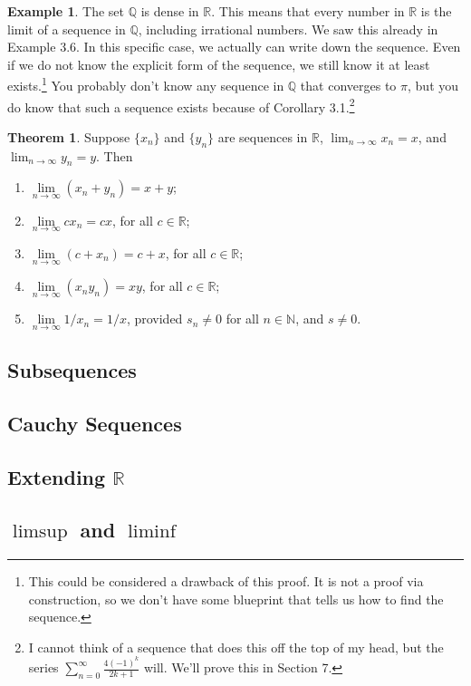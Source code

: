 \documentclass{article}
\newcommand{\N}{\mathbb{N}}
\newcommand{\R}{\mathbb{R}}
\newcommand{\Q}{\mathbb{Q}}
\theoremstyle{definition}
\newtheorem{theorem}{Theorem}[section]
\newtheorem{example}{Example}[section]
\begin{document}
\begin{example}
	The set $ \Q $ is dense in $ \R $. This means that every number in $ \R $ is the limit of a sequence in $ \Q $, including irrational numbers. We saw this already in Example 3.6. In this specific case, we actually can write down the sequence. Even if we do not know the explicit form of the sequence, we still know it at least exists.\footnote{This could be considered a drawback of this proof. It is not a proof via construction, so we don't have some blueprint that tells us how to find the sequence.} You probably don't know any sequence in $ \Q $ that converges to $ \pi $, but you do know that such a sequence exists because of Corollary 3.1.\footnote{I cannot think of a sequence that does this off the top of my head, but the series $ \sum_{n=0}^{\infty}\frac{4(-1)^k}{2k+1} $ will. We'll prove this in Section 7.} 
\end{example}
\begin{theorem}
	Suppose $ \{x_n\} $ and $ \{y_n\} $ are sequences in $ \R $, $ \lim_{n\to\infty}x_n=x $, and $ \lim_{n\to\infty}y_n=y $. Then
	\begin{enumerate}
		\item $ \lim\limits_{n\to\infty}(x_n+y_n)=x+y $;  
		\item $ \lim\limits_{n\to\infty}cx_n=cx $, for all $ c\in\R $; 
		\item $ \lim\limits_{n\to\infty}(c+x_n)=c+x $, for all $ c\in\R $;
		\item $ \lim\limits_{n\to\infty}(x_ny_n)=xy $, for all $ c\in\R $;
		\item $ \lim\limits_{n\to\infty}1/x_n=1/x$, provided $ s_n\neq 0 $ for all $ n\in \N $, and $ s\neq 0 $.
	\end{enumerate}
\end{theorem}
\subsection{Subsequences}
\subsection{Cauchy Sequences}
\subsection{Extending $ \R $}
\subsection{$ \limsup $ and $ \liminf $}
\end{document}

